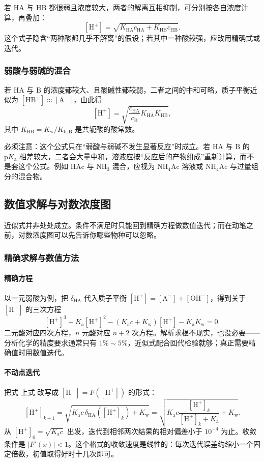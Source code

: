 \documentclass[UTF8]{ctexbook}
\begin{document}
若 $\mathrm{HA}$ 与 $\mathrm{HB}$ 都很弱且浓度较大，两者的解离互相抑制，可分别按各自浓度计算，再叠加：
\[
[\mathrm{H^+}]=\sqrt{K_{\mathrm{HA}}c_{\mathrm{HA}}+K_{\mathrm{HB}}c_{\mathrm{HB}}}.
\]
这个式子隐含“两种酸都几乎不解离”的假设；若其中一种酸较强，应改用精确式或迭代。

\subsubsection{弱酸与弱碱的混合}

若 $\mathrm{HA}$ 与 $\mathrm{B}$ 的浓度都较大、且酸碱性都较弱，二者之间的中和可略，质子平衡近似为 $[\mathrm{HB^+}]\approx[\mathrm{A^-}]$，由此得
\[
[\mathrm{H^+}]=\sqrt{\frac{c_{\mathrm{HA}}}{c_{\mathrm{B}}}K_{\mathrm{HA}}K_{\mathrm{HB}}},
\]
其中 $K_{\mathrm{HB}}=K_{\mathrm{w}}/K_{\mathrm{b,B}}$ 是共轭酸的酸常数。

必须注意：这个公式只在“弱酸与弱碱不发生显著反应”时成立。若 $\mathrm{HA}$ 与 $\mathrm{B}$ 的 $\mathrm{p}K_{\mathrm{a}}$ 相差较大，二者会大量中和，溶液应按“反应后的产物组成”重新计算，而不是套这个公式。例如 $\mathrm{HAc}$ 与 $\mathrm{NH_3}$ 混合，应视为 $\mathrm{NH_4Ac}$ 溶液或 $\mathrm{NH_4Ac}$ 与过量组分的混合物。

\subsection{数值求解与对数浓度图}

近似式并非处处成立。条件不满足时只能回到精确方程做数值迭代；而在动笔之前，对数浓度图可以先告诉你哪些物种可以忽略。

\subsubsection{精确求解与数值方法}



\paragraph{精确方程} 以一元弱酸为例，把 $\delta_{\mathrm{HA}}$ 代入质子平衡 $[\mathrm{H^+}]=[\mathrm{A^-}]+[\mathrm{OH^-}]$，得到关于 $[\mathrm{H^+}]$ 的三次方程
\[
[\mathrm{H^+}]^3+K_{\mathrm{a}}[\mathrm{H^+}]^2-(K_{\mathrm{a}}c+K_{\mathrm{w}})[\mathrm{H^+}]-K_{\mathrm{a}}K_{\mathrm{w}}=0.
\]
二元酸对应四次方程，$n$ 元酸对应 $n+2$ 次方程。解析求根不现实，也没必要——分析化学的精度要求通常只有 $1\%\sim5\%$，近似式配合回代检验就够；真正需要精确值时用数值迭代。

\paragraph{不动点迭代} 把式 上式 改写成 $[\mathrm{H^+}]=F([\mathrm{H^+}])$ 的形式：
\[
[\mathrm{H^+}]_{k+1}
=\sqrt{K_{\mathrm{a}}c\,\delta_{\mathrm{HA}}([\mathrm{H^+}]_k)+K_{\mathrm{w}}}
=\sqrt{K_{\mathrm{a}}c\frac{[\mathrm{H^+}]_k}{[\mathrm{H^+}]_k+K_{\mathrm{a}}}+K_{\mathrm{w}}}.
\]
从 $[\mathrm{H^+}]_0=\sqrt{K_{\mathrm{a}}c}$ 出发，迭代到相邻两次结果的相对偏差小于 $10^{-4}$ 为止。收敛条件是 $|F'(x)|<1$。这个格式的收敛速度是线性的：每次迭代误差约缩小一个固定倍数，初值取得好时十几次即可。
\end{document}
